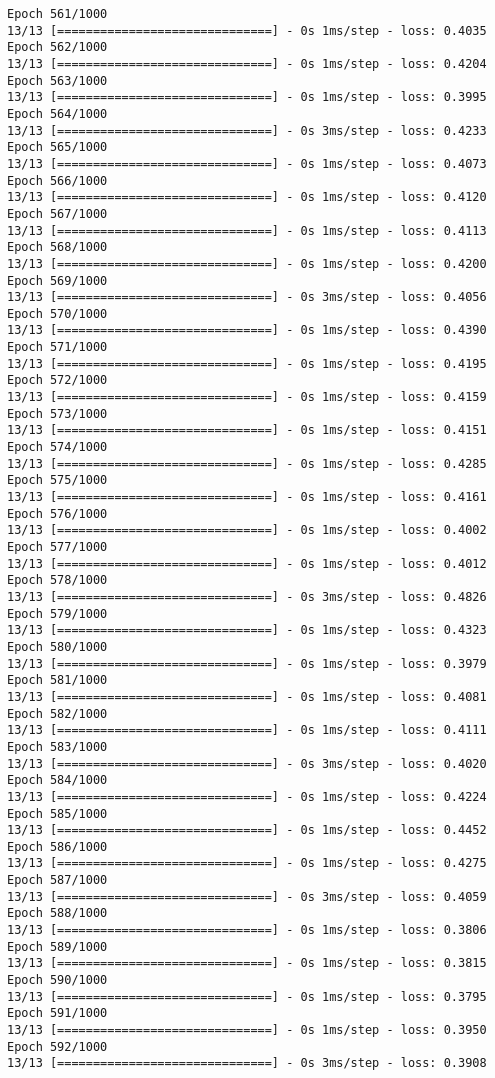 \documentclass[11pt]{article}
\begin{document}
\begin{Verbatim}[commandchars=\\\{\}]
Epoch 561/1000
13/13 [==============================] - 0s 1ms/step - loss: 0.4035
Epoch 562/1000
13/13 [==============================] - 0s 1ms/step - loss: 0.4204
Epoch 563/1000
13/13 [==============================] - 0s 1ms/step - loss: 0.3995
Epoch 564/1000
13/13 [==============================] - 0s 3ms/step - loss: 0.4233
Epoch 565/1000
13/13 [==============================] - 0s 1ms/step - loss: 0.4073
Epoch 566/1000
13/13 [==============================] - 0s 1ms/step - loss: 0.4120
Epoch 567/1000
13/13 [==============================] - 0s 1ms/step - loss: 0.4113
Epoch 568/1000
13/13 [==============================] - 0s 1ms/step - loss: 0.4200
Epoch 569/1000
13/13 [==============================] - 0s 3ms/step - loss: 0.4056
Epoch 570/1000
13/13 [==============================] - 0s 1ms/step - loss: 0.4390
Epoch 571/1000
13/13 [==============================] - 0s 1ms/step - loss: 0.4195
Epoch 572/1000
13/13 [==============================] - 0s 1ms/step - loss: 0.4159
Epoch 573/1000
13/13 [==============================] - 0s 1ms/step - loss: 0.4151
Epoch 574/1000
13/13 [==============================] - 0s 1ms/step - loss: 0.4285
Epoch 575/1000
13/13 [==============================] - 0s 1ms/step - loss: 0.4161
Epoch 576/1000
13/13 [==============================] - 0s 1ms/step - loss: 0.4002
Epoch 577/1000
13/13 [==============================] - 0s 1ms/step - loss: 0.4012
Epoch 578/1000
13/13 [==============================] - 0s 3ms/step - loss: 0.4826
Epoch 579/1000
13/13 [==============================] - 0s 1ms/step - loss: 0.4323
Epoch 580/1000
13/13 [==============================] - 0s 1ms/step - loss: 0.3979
Epoch 581/1000
13/13 [==============================] - 0s 1ms/step - loss: 0.4081
Epoch 582/1000
13/13 [==============================] - 0s 1ms/step - loss: 0.4111
Epoch 583/1000
13/13 [==============================] - 0s 3ms/step - loss: 0.4020
Epoch 584/1000
13/13 [==============================] - 0s 1ms/step - loss: 0.4224
Epoch 585/1000
13/13 [==============================] - 0s 1ms/step - loss: 0.4452
Epoch 586/1000
13/13 [==============================] - 0s 1ms/step - loss: 0.4275
Epoch 587/1000
13/13 [==============================] - 0s 3ms/step - loss: 0.4059
Epoch 588/1000
13/13 [==============================] - 0s 1ms/step - loss: 0.3806
Epoch 589/1000
13/13 [==============================] - 0s 1ms/step - loss: 0.3815
Epoch 590/1000
13/13 [==============================] - 0s 1ms/step - loss: 0.3795
Epoch 591/1000
13/13 [==============================] - 0s 1ms/step - loss: 0.3950
Epoch 592/1000
13/13 [==============================] - 0s 3ms/step - loss: 0.3908

\end{Verbatim}
\end{document}
